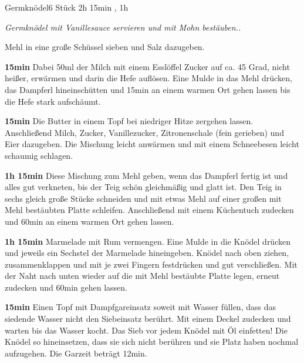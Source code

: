 \documentclass[../recipe-collections/cooking.tex]{subfiles}
\begin{document}
\begin{recipe}{Germknödel}{6 Stück }{2h 15min , 1h }

  \freeform{}\textit{Germknödel mit Vanillesauce servieren und mit Mohn bestäuben..}


  Mehl in eine große Schüssel sieben und Salz dazugeben.


  \textbf{15min}
  Dabei 50ml der Milch mit einem Esslöffel Zucker auf ca. 45 Grad, nicht heißer, erwärmen und darin die Hefe auflösen.
  Eine Mulde in das Mehl drücken, das Dampferl hineinschütten und 15min an einem warmen Ort gehen lassen bis die Hefe stark aufschäumt.


  \textbf{15min}
  Die Butter in einem Topf bei niedriger Hitze zergehen lassen.
  Anschließend Milch, Zucker, Vanillezucker, Zitronenschale (fein gerieben) und Eier dazugeben.
  Die Mischung leicht anwärmen und mit einem Schneebesen leicht schaumig schlagen.

  \newstep{}\textbf{1h 15min}
  Diese Mischung zum Mehl geben, wenn das Dampferl fertig ist und alles gut verkneten, bis der Teig schön gleichmäßig und glatt ist.
  Den Teig in sechs gleich große Stücke schneiden und mit etwas Mehl auf einer großen mit Mehl bestäubten Platte schleifen.
  Anschließend mit einem Küchentuch zudecken und 60min an einem warmen Ort gehen lassen.


  \textbf{1h 15min}
  Marmelade mit Rum vermengen.
  Eine Mulde in die Knödel drücken und jeweils ein Sechstel der Marmelade hineingeben.
  Knödel nach oben ziehen, zusammenklappen und mit je zwei Fingern festdrücken und gut verschließen.
  Mit der Naht nach unten wieder auf die mit Mehl bestäubte Platte legen, erneut zudecken und 60min gehen lassen.

  \newstep{}\textbf{15min}
  Einen Topf mit Dampfgareinsatz soweit mit Wasser füllen, dass das siedende Wasser nicht den Siebeinsatz berührt.
  Mit einem Deckel zudecken und warten bis das Wasser kocht.
  Das Sieb vor jedem Knödel mit Öl einfetten!
  Die Knödel so hineinsetzen, dass sie sich nicht berühren und sie Platz haben nochmal aufzugehen.
  Die Garzeit beträgt 12min.

  \freeform{}\hrulefill{}

\end{recipe}
\end{document}

